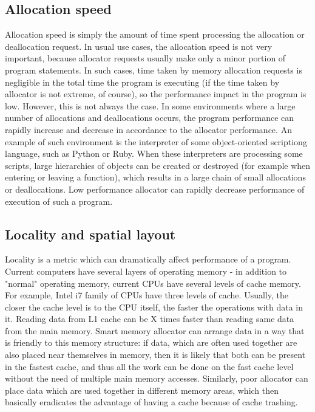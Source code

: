 \subsection{Allocation speed}

Allocation speed is simply the amount of time spent processing the allocation or deallocation request. In usual use cases, the allocation speed is not very important, because allocator requests usually make only a minor portion of program statements. In such cases, time taken by memory allocation requests is negligible in the total time the program is executing (if the time taken by allocator is not extreme, of course), so the performance impact in the program is low. However, this is not always the case. In some environments where a large number of allocations and deallocations occurs, the program performance can rapidly increase and decrease in accordance to the allocator performance. An example of such environment is the interpreter of some object-oriented scriptiong language, such as Python or Ruby. When these interpreters are processing some scripts, large hierarchies of objects can be created or destroyed (for example when entering or leaving a function), which results in a large chain of small allocations or deallocations. Low performance allocator can rapidly decrease performance of execution of such a program.

\subsection{Locality and spatial layout}

Locality is a metric which can dramatically affect performance of a program. Current computers have several layers of operating memory - in addition to "normal" operating memory, current CPUs have several levels of cache memory. For example, Intel i7 family of CPUs have three levels of cache. Usually, the closer the cache level is to the CPU itself, the faster the operations with data in it. Reading data from L1 cache can be X times\cite{drepper-memory} faster than reading same data from the main memory. Smart memory allocator can arrange data in a way that is friendly to this memory structure: if data, which are often used together are also placed near themselves in memory, then it is likely that both can be present in the fastest cache, and thus all the work can be done on the fast cache level without the need of multiple main memory accesses. Similarly, poor allocator can place data which are used together in different memory areas, which then basically eradicates the advantage of having a cache because of cache trashing.

